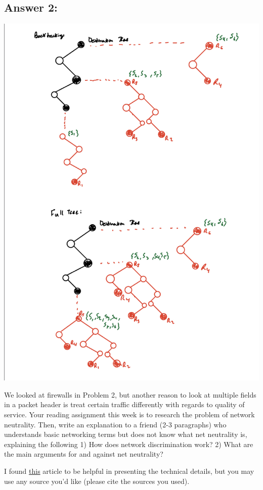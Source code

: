 \documentclass[10pt]{article}
\newenvironment{problem}[2][Problem]{\begin{trivlist}
\item[\hskip \labelsep {\bfseries #1}\hskip \labelsep {\bfseries #2.}]}{\end{trivlist}}
\begin{document}
\subsection*{Answer 2:}
\begin{center}
    \includegraphics[scale = 0.45]{hw6pr2.jpeg}
\end{center}

\begin{problem}{3: Reading}
We looked at firewalls in Problem 2, but another reason to look at multiple fields in a packet header is treat certain traffic differently with regards to quality of service. Your reading assignment this week is to research the problem of network neutrality. Then, write an explanation to a friend (2-3 paragraphs) who understands basic networking terms but does not know what net neutrality is, explaining the following 1) How does network discrimination work? 2) What are the main arguments for and against net neutrality?

I found \href{https://www.cs.princeton.edu/courses/archive/fall21/cos109/neutrality.pdf}{this} article to be helpful in presenting the technical details, but you may use any source you'd like (please cite the sources you used).
\end{problem}
\end{document}
